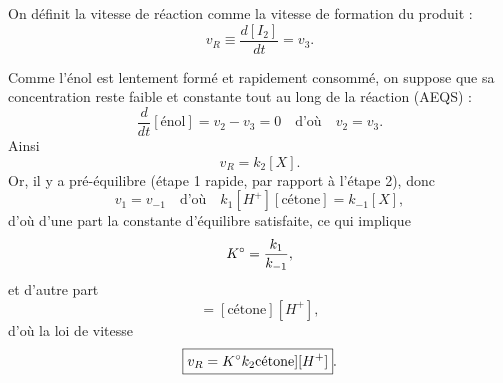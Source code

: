 \documentclass[11pt,a4paper]{report}
\begin{document}
On définit la vitesse de réaction comme la vitesse de formation du produit :
\begin{equation}
	v_R \equiv \frac{d[I_2]}{dt} = v_3.
\end{equation}

Comme l'énol est lentement formé et rapidement consommé, on suppose que sa concentration reste faible et constante tout au long de la réaction (AEQS) :
\begin{equation}
	\frac{d}{dt}[\text{énol}] = v_2 - v_3 = 0 \quad\text{d'où}\quad v_2 = v_3.
\end{equation}
Ainsi
\begin{equation}
	v_R = k_2[X].
\end{equation}
Or, il y a pré-équilibre (étape 1 rapide, par rapport à l'étape 2), donc
\begin{equation}
	v_1 = v_{-1} \quad\text{d'où}\quad k_1[H^+][\text{cétone}] = k_{-1}[X],
\end{equation}
d'où d'une part la constante d'équilibre satisfaite, ce qui implique
\begin{equation}
	K\degree = \frac{k_1}{k_{-1}},
\end{equation}
et d'autre part
\begin{equation}
	[X] = [\text{cétone}][H^+],
\end{equation}
d'où la loi de vitesse
\begin{equation}
	\boxed{v_R = K\degree k_2\text{cétone}][H^+]}.
\end{equation}
\end{document}
